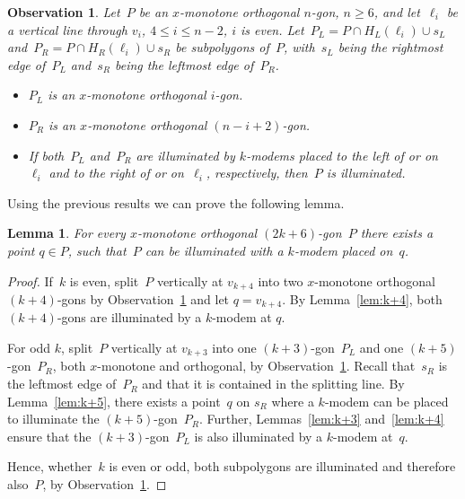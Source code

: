 \documentclass[A4]{article}
\newtheorem{lemma}[theorem]{Lemma}
\newtheorem{observation}[theorem]{Observation}
\begin{document}
\begin{observation}\label{obs:orthosplit}
Let~$P$ be an $x$-monotone orthogonal $n$-gon, $n\geq6$, and let~$\ell_i$ be a vertical line through $v_i$, $4\leq i\leq n-2$, $i$ is even.
Let~$P_L=P\cap H_L(\ell_i)\cup s_L$ and~$P_R=P\cap H_R(\ell_i)\cup s_R$ be subpolygons of~$P$, with~$s_L$ being the rightmost edge of~$P_L$ and~$s_R$ being the leftmost edge of~$P_R$.
\begin{itemize}\vspace*{-0.5ex}
\item $P_L$ is an $x$-monotone orthogonal $i$-gon.
\item $P_R$ is an $x$-monotone orthogonal $(n-i+2)$-gon.
\item If both~$P_L$ and~$P_R$ are illuminated by \mbox{$k$-modems} placed to the left of or on~$\ell_i$ and to the right of or on~$\ell_i$, respectively, then~$P$ is illuminated.
\end{itemize}
\end{observation}



Using the previous results we can prove the following lemma.

\begin{lemma}\label{lem:2k+6}
For every $x$-monotone orthogonal $(2k\!+\!6)$-gon~$P$ there exists a point $q\in P$, such that~$P$ can be illuminated with a \mbox{$k$-modem} placed on~$q$.
\end{lemma}
\begin{proof}
  If~$k$ is even, split~$P$ vertically at $v_{k+4}$ into two $x$-monotone orthogonal $(k\!+\!4)$-gons by Observation~\ref{obs:orthosplit} and let $q=v_{k+4}$.
  By Lemma~\ref{lem:k+4}, both $(k\!+\!4)$-gons are illuminated by a \mbox{$k$-modem} at $q$.


  For odd $k$, split~$P$ vertically at $v_{k+3}$ into one $(k\!+\!3)$-gon~$P_L$ and one $(k\!+\!5)$-gon~$P_R$, both $x$-monotone and orthogonal, by Observation~\ref{obs:orthosplit}.
  Recall that~$s_R$ is the leftmost edge of~$P_R$ and that it is contained in the splitting line. 
By Lemma~\ref{lem:k+5}, there exists a point~$q$ on $s_R$ where a \mbox{$k$-modem} can be placed to illuminate the $(k\!+\!5)$-gon~$P_R$.
  Further, Lemmas~\ref{lem:k+3} and~\ref{lem:k+4} ensure that the $(k\!+\!3)$-gon~$P_L$ is also illuminated by a \mbox{$k$-modem} at~$q$.

  Hence, whether~$k$ is even or odd, both subpolygons are illuminated and therefore also~$P$, by Observation~\ref{obs:orthosplit}. \end{proof}
\end{document}
